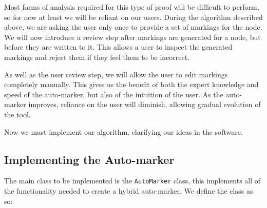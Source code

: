 \documentclass[twoside,a4paper]{report}
\begin{document}
Most forms of analysis required for this type of proof will be difficult to perform, so for now at least we will be reliant on our users. During the
algorithm described above, we are asking the user only once to provide a set of markings for the node. We will now introduce a review step
after markings are generated for a node, but before they are written to it. This allows a user to inspect the generated markings and reject them if
they feel them to be incorrect.

As well as the user review step, we will allow the user to edit markings completely manually. This gives us the benefit of both the expert
knowledge and speed of the auto-marker, but also of the intuition of the user. As the auto-marker improves, reliance on the user will diminish, allowing
gradual evolution of the tool.

Now we must implement our algorithm, clarifying our ideas in the software.

\subsection{Implementing the Auto-marker}

The main class to be implemented is the \texttt{AutoMarker} class, this implements all of the functionality needed to create a hybrid auto-marker.
We define the class as so:
\end{document}
